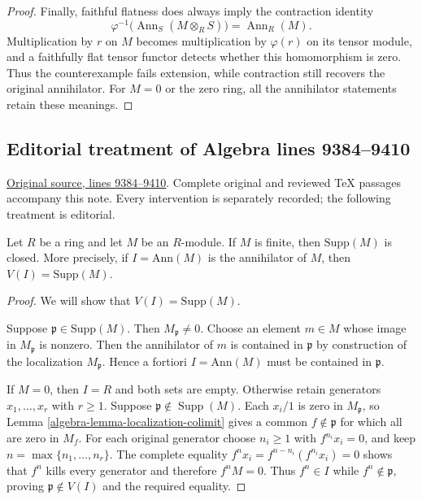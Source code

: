 \begin{proof}
Finally, faithful flatness does always imply the contraction
identity
$$
\varphi^{-1}\bigl(\operatorname{Ann}_S(M\otimes_RS)\bigr)
=\operatorname{Ann}_R(M).
$$
Multiplication by $r$ on $M$ becomes multiplication by
$\varphi(r)$ on its tensor module, and a faithfully flat
tensor functor detects whether this homomorphism is zero.
Thus the counterexample fails extension, while contraction
still recovers the original annihilator. For $M=0$ or the
zero ring, all the annihilator statements retain these meanings.
\end{proof}


\subsection{Editorial treatment of Algebra lines 9384--9410}

\hypertarget{algebra-context-100}{}

\noindent\href{https://github.com/stacks/stacks-project/blob/a04446e57ec1fbc252a871afcec7752fb2807b14/algebra.tex\#L9384}{Original source, lines 9384--9410}. Complete original and reviewed TeX passages accompany this note. Every intervention is separately recorded; the following treatment is editorial.


\begin{lemma}
\label{editorial-source-lemma-support-closed}
Let $R$ be a ring and let $M$ be an $R$-module.
If $M$ is finite, then $\text{Supp}(M)$ is closed.
More precisely, if $I = \text{Ann}(M)$ is the annihilator of $M$, then
$V(I) = \text{Supp}(M)$.
\end{lemma}

\begin{proof}
We will show that $V(I) = \text{Supp}(M)$.

\medskip\noindent
Suppose $\mathfrak p \in \text{Supp}(M)$. Then $M_{\mathfrak p} \not = 0$.
Choose an element $m \in M$ whose image in $M_\mathfrak p$ is nonzero.
Then the annihilator of $m$ is contained in $\mathfrak p$ by construction
of the localization $M_\mathfrak p$. Hence
a fortiori $I = \text{Ann}(M)$ must be contained in $\mathfrak p$.

\medskip\noindent
If $M=0$, then $I=R$ and both sets are empty.
Otherwise retain generators $x_1,\ldots,x_r$ with $r\geq1$.
Suppose $\mathfrak p\notin\operatorname{Supp}(M)$.
Each $x_i/1$ is zero in $M_{\mathfrak p}$, so
Lemma \ref{algebra-lemma-localization-colimit} gives a common
$f\notin\mathfrak p$ for which all are zero in $M_f$.
For each original generator choose $n_i\geq1$ with
$f^{n_i}x_i=0$, and keep $n=\max\{n_1,\ldots,n_r\}$.
The complete equality
$f^nx_i=f^{n-n_i}(f^{n_i}x_i)=0$ shows that $f^n$ kills
every generator and therefore $f^nM=0$.
Thus $f^n\in I$ while $f^n\notin\mathfrak p$, proving
$\mathfrak p\notin V(I)$ and the required equality.
\end{proof}

